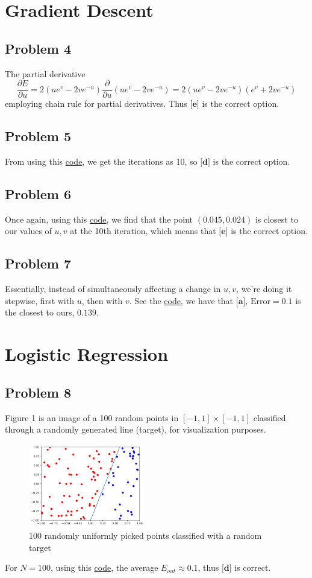\documentclass{article}
\begin{document}
\section*{Gradient Descent}
\subsection*{Problem 4}
The partial derivative
\begin{equation*}
    \frac{\partial E}{\partial u} = 2(ue^{v} - 2ve^{-u})\frac{\partial}{\partial u}(ue^{v} - 2ve^{-u}) = 2(ue^{v} - 2ve^{-u})(e^{v} + 2ve^{-u})
\end{equation*}
employing chain rule for partial derivatives. Thus $\textbf{[e]}$ is the correct option.
\subsection*{Problem 5}
From using this \hyperref[prob5]{code}, we get the iterations as 10, so $\textbf{[d]}$ is the correct option.
\subsection*{Problem 6}
Once again, using this \hyperref[prob5]{code}, we find that the point $(0.045, 0.024)$ is closest to our values of $u,v$ at the 10th iteration, which means that $\textbf{[e]}$ is the correct option. 
\subsection*{Problem 7}
Essentially, instead of simultaneously affecting a change in $u, v$, we're doing it stepwise, first with $u$, then with $v$. See the \hyperref[prob6]{code}, we have that $\textbf{[a]}$, $\text{Error} = 0.1$ is the closest to ours, $0.139$. 
\section*{Logistic Regression}
\subsection*{Problem 8}
Figure 1 is an image of a 100 random points in $[-1, 1]\times[-1,1]$ classified through a randomly generated line (target), for visualization purposes.
\begin{figure}[htp]
    \centering
    \includegraphics[width=2in]{plothw5.png}
    \caption{100 randomly uniformly picked points classified with a random target}
    \label{fig:galaxy}
\end{figure}
For $N = 100$, using this \hyperref[prob8]{code}, the average $E_{out} \approx 0.1$, thus $\textbf{[d]}$ is correct.
\end{document}
